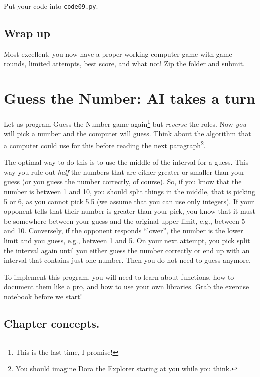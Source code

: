 \documentclass[
]{book}
\begin{document}
Put your code into \texttt{code09.py}.

\hypertarget{wrap-up}{%
\section{Wrap up}\label{wrap-up}}

Most excellent, you now have a proper working computer game with game rounds, limited attempts, best score, and what not! Zip the folder and submit.

\hypertarget{guess-the-number-ai}{%
\chapter{Guess the Number: AI takes a turn}\label{guess-the-number-ai}}

Let us program Guess the Number game again\footnote{This is the last time, I promise!} but \emph{reverse} the roles. Now \emph{you} will pick a number and the computer will guess. Think about the algorithm that a computer could use for this before reading the next paragraph\footnote{You should imagine Dora the Explorer staring at you while you think.}.

The optimal way to do this is to use the middle of the interval for a guess. This way you rule out \emph{half} the numbers that are either greater or smaller than your guess (or you guess the number correctly, of course). So, if you know that the number is between 1 and 10, you should split things in the middle, that is picking 5 or 6, as you cannot pick 5.5 (we assume that you can use only integers). If your opponent tells that their number is greater than your pick, you know that it must be somewhere between your guess and the original upper limit, e.g., between 5 and 10. Conversely, if the opponent responds ``lower'', the number is the lower limit and you guess, e.g., between 1 and 5. On your next attempt, you pick split the interval again until you either guess the number correctly or end up with an interval that contains just one number. Then you do not need to guess anymore.

To implement this program, you will need to learn about functions, how to document them like a pro, and how to use your own libraries. Grab the \href{notebooks/Guess\%20the\%20number\%20-\%20AI.ipynb}{exercise notebook} before we start!

\hypertarget{chapter-concepts.}{%
\section{Chapter concepts.}\label{chapter-concepts.}}
\end{document}

